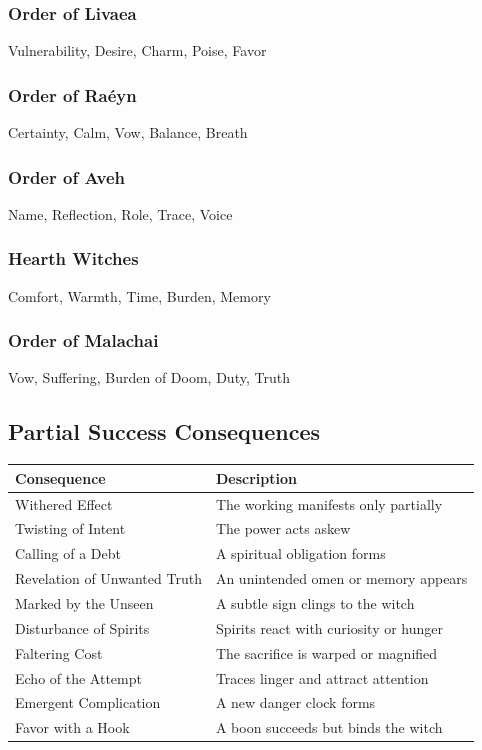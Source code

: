 \documentclass[11pt]{book}
\begin{document}
\subsubsection*{Order of Livaea}
Vulnerability, Desire, Charm, Poise, Favor

\subsubsection*{Order of Raéyn}
Certainty, Calm, Vow, Balance, Breath

\subsubsection*{Order of Aveh}
Name, Reflection, Role, Trace, Voice

\subsubsection*{Hearth Witches}
Comfort, Warmth, Time, Burden, Memory

\subsubsection*{Order of Malachai}
Vow, Suffering, Burden of Doom, Duty, Truth

\subsection*{Partial Success Consequences}

\begin{center}
\begin{longtable}{p{} p{}}
\toprule
\textbf{Consequence} & \textbf{Description} \\
\midrule
Withered Effect & The working manifests only partially \\
Twisting of Intent & The power acts askew \\
Calling of a Debt & A spiritual obligation forms \\
Revelation of Unwanted Truth & An unintended omen or memory appears \\
Marked by the Unseen & A subtle sign clings to the witch \\
Disturbance of Spirits & Spirits react with curiosity or hunger \\
Faltering Cost & The sacrifice is warped or magnified \\
Echo of the Attempt & Traces linger and attract attention \\
Emergent Complication & A new danger clock forms \\
Favor with a Hook & A boon succeeds but binds the witch \\
\bottomrule
\end{longtable}
\end{center}
\end{document}
